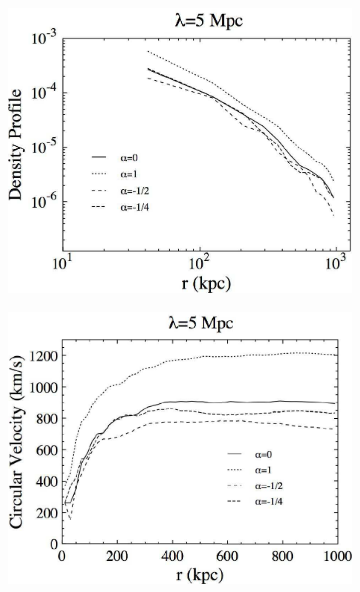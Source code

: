\documentclass{article}
\begin{document}
\begin{table}
\centering
{}
\caption{\\SF values used in the simulations.}
\label{tab:my-table}
\end{table}
\begin{figure}
     \centering
     \begin{subfigure}[b]{0.45\textwidth}
         \centering
         \includegraphics[width=\textwidth]{images/2a.PNG}
         \caption{}
         \label{fig:2a}
     \end{subfigure}
     \hfill
     \begin{subfigure}[b]{0.45\textwidth}
         \centering
         \includegraphics[width=\textwidth]{images/2b.PNG}

\end{subfigure}
\end{figure}
\end{document}
